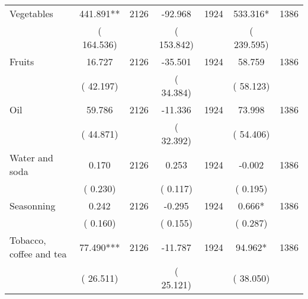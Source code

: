 \begin{tabular}{l*{6}{c}}
Vegetables        &            441.891**      &       2126       &            -92.968      &       1924       &            533.316*      &       1386       \\
                       &       (     164.536)            &                               &       (     153.842)            &                               &       (     239.595)            &                               \\
Fruits        &             16.727      &       2126       &            -35.501      &       1924       &             58.759      &       1386       \\
                       &       (      42.197)            &                               &       (      34.384)            &                               &       (      58.123)            &                               \\
Oil        &             59.786      &       2126       &            -11.336      &       1924       &             73.998      &       1386       \\
                       &       (      44.871)            &                               &       (      32.392)            &                               &       (      54.406)            &                               \\
Water and soda        &              0.170      &       2126       &              0.253      &       1924       &             -0.002      &       1386       \\
                       &       (       0.230)            &                               &       (       0.117)            &                               &       (       0.195)            &                               \\
Seasonning        &              0.242      &       2126       &             -0.295      &       1924       &              0.666*      &       1386       \\
                       &       (       0.160)            &                               &       (       0.155)            &                               &       (       0.287)            &                               \\
Tobacco, coffee and tea        &             77.490***      &       2126       &            -11.787      &       1924       &             94.962*      &       1386       \\
                       &       (      26.511)            &                               &       (      25.121)            &                               &       (      38.050)            &                               \\

\end{tabular}

